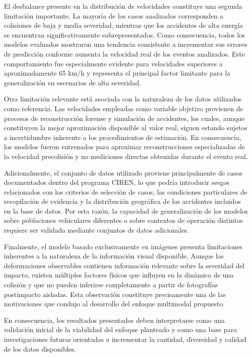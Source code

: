 \documentclass[esp]{SpeedEstimationAI_paper}
\begin{document}
El desbalance presente en la distribución de velocidades constituye una segunda limitación importante. La mayoría de los casos analizados corresponden a colisiones de baja y media severidad, mientras que los accidentes de alta energía se encuentran significativamente subrepresentados. Como consecuencia, todos los modelos evaluados mostraron una tendencia consistente a incrementar sus errores de predicción conforme aumenta la velocidad real de los eventos analizados. Este comportamiento fue especialmente evidente para velocidades superiores a aproximadamente 65 km/h y representa el principal factor limitante para la generalización en escenarios de alta severidad.

Otra limitación relevante está asociada con la naturaleza de los datos utilizados como referencia. Las velocidades empleadas como variable objetivo provienen de procesos de reconstrucción forense y simulación de accidentes, los cuales, aunque constituyen la mejor aproximación disponible al valor real, siguen estando sujetos a incertidumbre inherente a los procedimientos de estimación. En consecuencia, los modelos fueron entrenados para aproximar reconstrucciones especializadas de la velocidad precolisión y no mediciones directas obtenidas durante el evento real.

Adicionalmente, el conjunto de datos utilizado proviene principalmente de casos documentados dentro del programa CIREN, lo que podría introducir sesgos relacionados con los criterios de selección de casos, las condiciones particulares de recopilación de evidencia y la distribución geográfica de los accidentes incluidos en la base de datos. Por esta razón, la capacidad de generalización de los modelos sobre poblaciones vehiculares diferentes o sobre contextos de operación distintos requiere ser validada mediante conjuntos de datos adicionales.

Finalmente, el modelo basado exclusivamente en imágenes presenta limitaciones inherentes a la naturaleza de la información visual disponible. Aunque las deformaciones observables contienen información relevante sobre la severidad del impacto, existen múltiples factores físicos que influyen en la dinámica de una colisión y que no pueden inferirse completamente a partir de fotografías postimpacto aisladas. Esta observación constituye precisamente una de las motivaciones que condujo al desarrollo del enfoque multimodal propuesto.

En consecuencia, los resultados presentados deben interpretarse como una validación inicial de la viabilidad del enfoque planteado y como una base para investigaciones futuras orientadas a incrementar la cantidad, diversidad y calidad de los datos disponibles.
\end{document}
